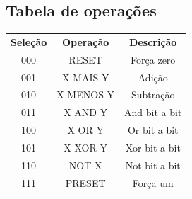 \documentclass{article}
\begin{document}
\subsection{Tabela de operações}

\begin{center}
    \begin{tabular}{ c|c|c }

        \textbf{Seleção} & \textbf{Operação} & \textbf{Descrição} \\
    000 & RESET & Força zero\\
    001 & X MAIS Y & Adição\\
    010 & X MENOS Y & Subtração\\
    011 & X AND Y & And bit a bit\\
    100 & X OR Y & Or bit a bit\\
    101 & X XOR Y & Xor bit a bit\\
    110 & NOT X & Not bit a bit\\
    111 & PRESET & Força um\\

\end{tabular}
\end{center}

\begin{verbatim}
\end{verbatim}
\end{document}
